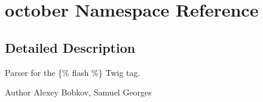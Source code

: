 \hypertarget{namespaceoctober}{\section{october Namespace Reference}
\label{namespaceoctober}
}


\subsection{Detailed Description}
Parser for the \{\% flash \%\} Twig tag.

\begin{DoxyAuthor}{Author}
Alexey Bobkov, Samuel Georges 
\end{DoxyAuthor}
